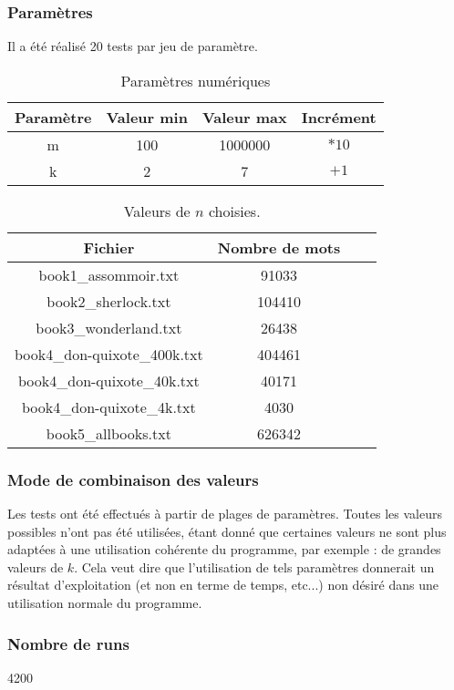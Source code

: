 \subsubsection{Paramètres}
Il a été réalisé 20 tests par jeu de paramètre.

\begin{table}[H]
	\centering
	\caption{Paramètres numériques}
	\label{tab:parametresNumeriquesFournie}
	\begin{tabular}{c|ccc}
		\toprule
		Paramètre & Valeur min & Valeur max & Incrément\\
		\midrule
		m & 100 & 1000000 & $*10$\\
		k & 2 & 7 & $+1$\\
		\bottomrule
	\end{tabular}
\end{table}

\begin{table}[H]
	\centering
	\caption{Valeurs de $n$ choisies.}
	\label{tab:valeursDeNChoisiesFournie}
	\begin{tabular}{c|ccc}
		\toprule
		Fichier & Nombre de mots\\
		\midrule
		book1\_assommoir.txt & 91033\\
		book2\_sherlock.txt & 104410\\
		book3\_wonderland.txt & 26438\\
		book4\_don-quixote\_400k.txt & 404461\\
		book4\_don-quixote\_40k.txt & 40171\\
		book4\_don-quixote\_4k.txt & 4030\\
		book5\_allbooks.txt & 626342\\
		\bottomrule
	\end{tabular}
\end{table}


\subsubsection{Mode de combinaison des valeurs}
Les tests ont été effectués à partir de plages de paramètres. Toutes les valeurs possibles n'ont pas été utilisées, étant donné que certaines valeurs ne sont plus adaptées à une utilisation cohérente du programme, par exemple : de grandes valeurs de $k$. Cela veut dire que l'utilisation de tels paramètres donnerait un résultat d'exploitation (et non en terme de temps, etc...) non désiré dans une utilisation normale du programme.

\subsubsection{Nombre de runs}
4200

